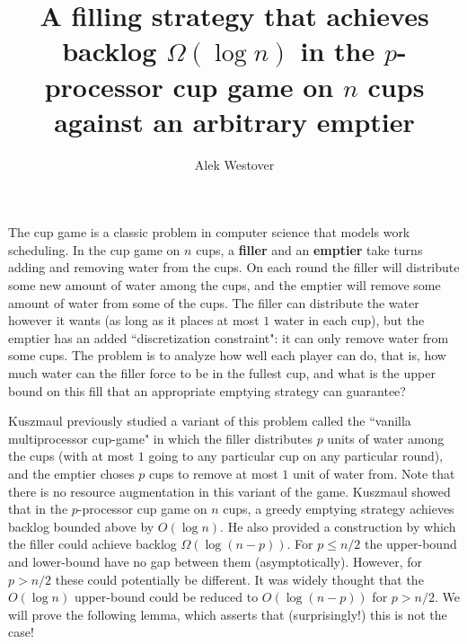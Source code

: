 \documentclass{article}[11pt]
\author{Alek Westover}
\title{ A filling strategy that achieves backlog $\Omega(\log n)$ in the $p$-processor cup game on $n$ cups against an arbitrary emptier}
\begin{document}
\maketitle

The cup game is a classic problem in computer science that models work scheduling.
In the cup game on $n$ cups, a \textbf{filler} and an \textbf{emptier} take turns adding and
removing water from the cups. On each round the filler will distribute some new
amount of water among the cups, and the emptier will remove some amount of water
from some of the cups. The filler can distribute the water however it wants (as
long as it places at most $1$ water in each cup), but the emptier has an added
``discretization constraint": it can only remove water from some cups. The
problem is to analyze how well each player can do, that is, how much water can
the filler force to be in the fullest cup, and what is the upper bound on this
fill that an appropriate emptying strategy can guarantee?

Kuszmaul previously studied a variant of this problem called the ``vanilla
multiprocessor cup-game" in which the filler distributes $p$ units of water
among the cups (with at most $1$ going to any particular cup on any particular
round), and the emptier choses $p$ cups to remove at most $1$ unit of water
from. Note that there is no resource augmentation in this variant of the game.
Kuszmaul showed that in the $p$-processor cup game on $n$ cups, a greedy
emptying strategy achieves backlog bounded above by $O(\log n)$. He also
provided a construction by which the filler could achieve backlog $\Omega(\log
(n-p))$. For $p \le n/2$ the upper-bound and lower-bound have no gap between
them (asymptotically). However, for $p > n/2$ these could potentially be
different. It was widely thought that the $O(\log n)$ upper-bound could be
reduced to $O(\log(n-p))$ for $p>n/2$. We will prove the following lemma, which
asserts that (surprisingly!) this is not the case!
\end{document}
